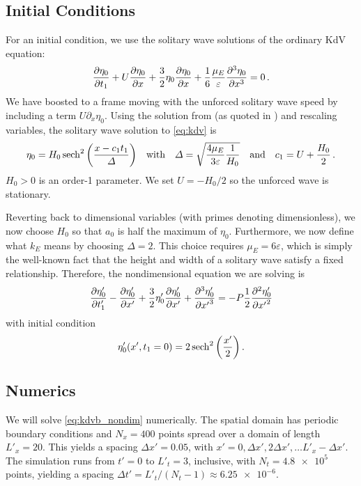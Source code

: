 \documentclass{jfm}
\renewcommand*{\epsilon}{\varepsilon}
\begin{document}
\subsection{Initial Conditions}
For an initial condition, we use the solitary wave solutions of
the ordinary KdV equation:
\begin{equation}
  \pdv{\eta_0}{t_1} + U\pdv{\eta_0}{x} + \frac{3}{2}
    \eta_0 \pdv{\eta_0}{x} + \frac{1}{6} \frac{\mu_E}{\epsilon}
    \pdv[3]{\eta_0}{x} = 0 \,.
  \label{eq:kdv}
\end{equation}
We have boosted to a frame moving with the unforced solitary wave speed
by including a term $U\partial_x \eta_0$.
Using the solution from \citet{dingemans1997water} (as quoted in
\citealp{brun2018convective}) and rescaling variables, the solitary
wave solution to \cref{eq:kdv} is
\begin{equation}
  \eta_0 = H_0 \sech^2\pqty{\frac{x - c_1 t_1}{\Delta}}
  \qq{with}
  \Delta = \sqrt{\frac{4 \mu_E}{3\epsilon} \frac{1}{H_0}}
  \qq{and}
  c_1 = U + \frac{H_0}{2} \,.
\end{equation}
$H_0>0$ is an order-1 parameter.
We set $U=-H_0/2$ so the unforced wave is stationary.

Reverting back to dimensional variables (with primes denoting
dimensionless), we now choose $H_0$ so that $a_0$ is half the maximum of
$\eta_0$.
Furthermore, we now define what $k_E$ means by choosing $\Delta = 2$.
This choice requires $\mu_E = 6 \epsilon$, which is simply the
well-known fact that the height and width of a solitary wave satisfy a
fixed relationship.
Therefore, the nondimensional equation we are solving is
\begin{equation}
  \pdv{\eta'_0}{t'_1} - \pdv{\eta'_0}{x'} + \frac{3}{2}
  \eta'_0 \pdv{\eta'_0}{x'} + \pdv[3]{\eta'_0}{{x'}} =
  -P \frac{1}{2} \pdv[2]{\eta'_0}{{x'}}
  \label{eq:kdvb_nondim}
\end{equation}
with initial condition
\begin{equation}
  \eta'_0(x',t_1=0) = 2 \sech^2\pqty{\frac{x'}{2}} \,.
  \label{eq:initial_condition}
\end{equation}

\subsection{Numerics}
We will solve \cref{eq:kdvb_nondim} numerically.
The spatial domain has periodic boundary conditions and $N_x = 400$
points spread over a domain of length $L'_x = 20$.
This yields a spacing $\Delta x' = 0.05$, with $x' = 0, \Delta x',
2\Delta x', \ldots L'_x - \Delta x'$.
The simulation runs from $t'= 0$ to $L'_t = 3$, inclusive, with
$N_t = \num{4.8e5}$ points, yielding a spacing $\Delta t' = L'_t/(N_t-1)
\approx \num{6.25e-6}$.
\end{document}
